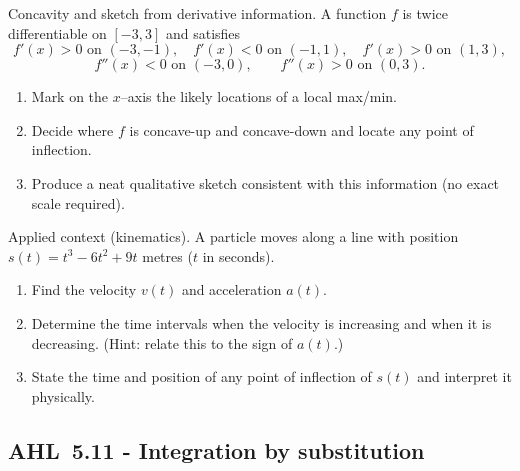 \documentclass[11pt]{article}
\def\textbf#1{#1}%
\newcommand{\tocsubsection}[1]{\subsection{#1}}
\newcounter{question}
\begin{document}
\begin{question}
\textbf{Concavity and sketch from derivative information.}
A function $f$ is twice differentiable on $[-3,3]$ and satisfies
\[
f'(x)>0 \text{ on }(-3,-1),\quad f'(x)<0 \text{ on }(-1,1),\quad f'(x)>0 \text{ on }(1,3),
\]
\[
f''(x)<0 \text{ on }(-3,0),\qquad f''(x)>0 \text{ on }(0,3).
\]
\begin{enumerate}
  \item Mark on the $x$–axis the likely locations of a local max/min.
  \item Decide where $f$ is concave-up and concave-down and locate any point of inflection.
  \item Produce a neat qualitative sketch consistent with this information (no exact scale required).
\end{enumerate}

\begin{center}
\end{center}
\end{question}

\begin{question}
\textbf{Applied context (kinematics).}
A particle moves along a line with position $s(t)=t^{3}-6t^{2}+9t$ metres ($t$ in seconds).
\begin{enumerate}
  \item Find the velocity $v(t)$ and acceleration $a(t)$.
  \item Determine the time intervals when the velocity is increasing and when it is decreasing.  
  (Hint: relate this to the sign of $a(t)$.)
  \item State the time and position of any point of inflection of $s(t)$ and interpret it physically.
\end{enumerate}
\end{question}

\tocsubsection{AHL 5.11 - Integration by substitution}

\end{document}
